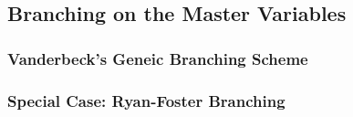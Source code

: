 \subsection{Branching on the Master Variables}\label{sec:cg_bp_bp_branching_master}
\subsubsection{Vanderbeck's Geneic Branching Scheme}
\subsubsection{Special Case: Ryan-Foster Branching}
